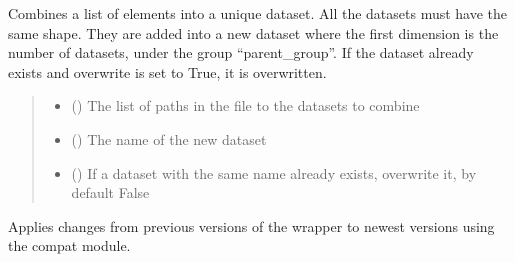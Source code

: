 \documentclass[letterpaper,10pt,english]{sphinxmanual}
\begin{document}
\begin{fulllineitems}
\begin{fulllineitems}
\label{\detokenize{source/HDF5_BLS:HDF5_BLS.wrapper.Wrapper.combine_datasets}}
\pysigstartsignatures
\pysiglinewithargsret
{}
{\sphinxparamcomma {}\sphinxparamcomma {}\sphinxparamcomma {}}
{}
\pysigstopsignatures
\sphinxAtStartPar
Combines a list of elements into a unique dataset. All the datasets must have the same shape. They are added into a new dataset where the first dimension is the number of datasets, under the group “parent\_group”. If the dataset already exists and overwrite is set to True, it is overwritten.
\begin{quote}\begin{description}
\begin{itemize}
\item {} 
\sphinxAtStartPar
{} () \textendash{} The list of paths in the file to the datasets to combine

\item {} 
\sphinxAtStartPar
{} () \textendash{} The name of the new dataset

\item {} 
\sphinxAtStartPar
{} (\sphinxstyleliteralemphasis{\sphinxupquote{, }}) \textendash{} If a dataset with the same name already exists, overwrite it, by default False

\end{itemize}

\end{description}\end{quote}

\end{fulllineitems}


\begin{fulllineitems}
\label{\detokenize{source/HDF5_BLS:HDF5_BLS.wrapper.Wrapper.compatibility_changes}}
\pysigstartsignatures
\pysiglinewithargsret
{}
{}
{}
\pysigstopsignatures
\sphinxAtStartPar
Applies changes from previous versions of the wrapper to newest versions using the compat module.


\end{fulllineitems}
\end{fulllineitems}
\end{document}
